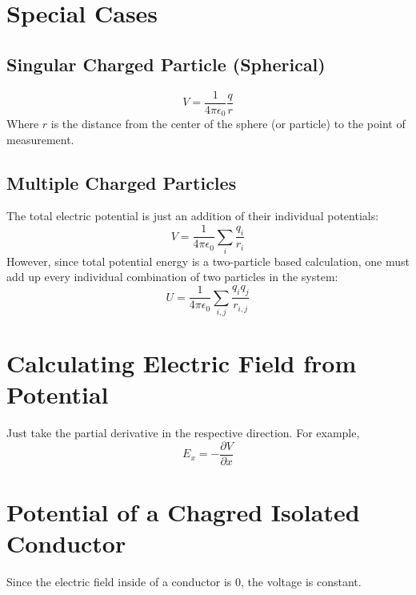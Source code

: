 \documentclass[]{article}
\begin{document}
\section{Special Cases}
\subsection{Singular Charged Particle (Spherical)}
\[ V = \frac{1}{4\pi\epsilon_0} \frac{q}{r} \]
Where $ r $ is the distance from the center of the sphere (or particle) to the point of measurement.

\subsection{Multiple Charged Particles}
The total electric potential is just an addition of their individual potentials:
\[ V = \frac{1}{4\pi\epsilon_0} \sum_{i} \frac{q_i}{r_i} \] However, since total potential energy is a two-particle based calculation, one must add up every individual combination of two particles in the system:
\[ U = \frac{1}{4\pi\epsilon_0} \sum_{i, j} \frac{q_i q_j}{r_{i,j}} \]

\section{Calculating Electric Field from Potential}
Just take the partial derivative in the respective direction. For example,
\[ E_x = - \frac{\partial V}{\partial x} \]

\section{Potential of a Chagred Isolated Conductor}
Since the electric field inside of a conductor is 0, the voltage is constant.
\end{document}
